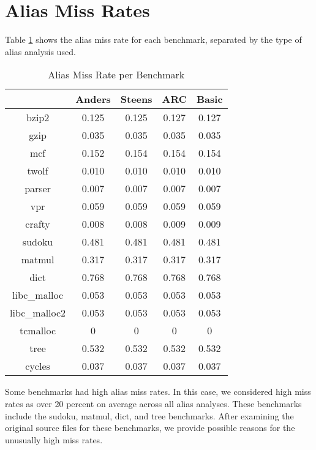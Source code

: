 \section{Alias Miss Rates}
Table \ref{table:3} shows the alias miss rate for each benchmark, separated by the type of alias analysis used.

\begin{table} [h!]
\centering
   \begin{tabular} {|c|c c c c|}
      \hline
      & Anders & Steens & ARC & Basic \\
      \hline
	   bzip2 & 0.125 & 0.125 & 0.127 & 0.127 \\
      \hline
	   gzip & 0.035 & 0.035 & 0.035 & 0.035 \\
      \hline
           mcf & 0.152 & 0.154 & 0.154 & 0.154 \\
      \hline
	   twolf & 0.010 & 0.010 & 0.010 & 0.010 \\
      \hline
	   parser & 0.007 & 0.007 & 0.007 & 0.007 \\
      \hline
	   vpr & 0.059 & 0.059 & 0.059 & 0.059 \\
      \hline
	   crafty & 0.008 & 0.008 & 0.009 & 0.009 \\
      \hline
	   sudoku & 0.481 & 0.481 & 0.481 & 0.481 \\
      \hline
	   matmul & 0.317 & 0.317 & 0.317 & 0.317 \\
      \hline
	   dict & 0.768 & 0.768 & 0.768 & 0.768 \\
      \hline
	   libc\_malloc & 0.053 & 0.053 & 0.053 & 0.053 \\
      \hline
	   libc\_malloc2 & 0.053 & 0.053 & 0.053 & 0.053 \\
      \hline
	   tcmalloc & 0 & 0 & 0 & 0 \\
      \hline
	   tree & 0.532 & 0.532 & 0.532 & 0.532 \\
      \hline
	   cycles & 0.037 & 0.037 & 0.037 & 0.037 \\
      \hline
   \end{tabular}
   \caption{Alias Miss Rate per Benchmark}
   \label{table:3}
\end{table}

Some benchmarks had high alias miss rates. In this case, we considered high miss rates as over 20 percent on average across all alias analyses. These benchmarks include the sudoku, matmul, dict, and tree benchmarks. After examining the original source files for these benchmarks, we provide possible reasons for the unusually high miss rates.

